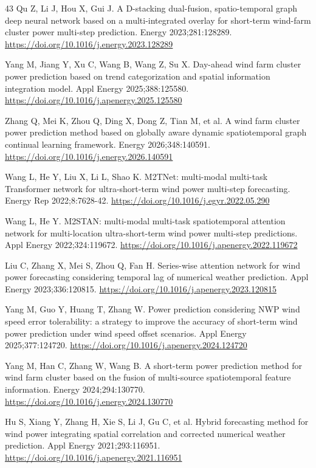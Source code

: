\begin{thebibliography}{43}
Qu Z, Li J, Hou X, Gui J. A D-stacking dual-fusion, spatio-temporal graph deep neural network based on a multi-integrated overlay for short-term wind-farm cluster power multi-step prediction. Energy 2023;281:128289. \url{https://doi.org/10.1016/j.energy.2023.128289}

Yang M, Jiang Y, Xu C, Wang B, Wang Z, Su X. Day-ahead wind farm cluster power prediction based on trend categorization and spatial information integration model. Appl Energy 2025;388:125580. \url{https://doi.org/10.1016/j.apenergy.2025.125580}

Zhang Q, Mei K, Zhou Q, Ding X, Dong Z, Tian M, et al. A wind farm cluster power prediction method based on globally aware dynamic spatiotemporal graph continual learning framework. Energy 2026;348:140591. \url{https://doi.org/10.1016/j.energy.2026.140591}

Wang L, He Y, Liu X, Li L, Shao K. M2TNet: multi-modal multi-task Transformer network for ultra-short-term wind power multi-step forecasting. Energy Rep 2022;8:7628-42. \url{https://doi.org/10.1016/j.egyr.2022.05.290}

Wang L, He Y. M2STAN: multi-modal multi-task spatiotemporal attention network for multi-location ultra-short-term wind power multi-step predictions. Appl Energy 2022;324:119672. \url{https://doi.org/10.1016/j.apenergy.2022.119672}

Liu C, Zhang X, Mei S, Zhou Q, Fan H. Series-wise attention network for wind power forecasting considering temporal lag of numerical weather prediction. Appl Energy 2023;336:120815. \url{https://doi.org/10.1016/j.apenergy.2023.120815}

Yang M, Guo Y, Huang T, Zhang W. Power prediction considering NWP wind speed error tolerability: a strategy to improve the accuracy of short-term wind power prediction under wind speed offset scenarios. Appl Energy 2025;377:124720. \url{https://doi.org/10.1016/j.apenergy.2024.124720}

Yang M, Han C, Zhang W, Wang B. A short-term power prediction method for wind farm cluster based on the fusion of multi-source spatiotemporal feature information. Energy 2024;294:130770. \url{https://doi.org/10.1016/j.energy.2024.130770}

Hu S, Xiang Y, Zhang H, Xie S, Li J, Gu C, et al. Hybrid forecasting method for wind power integrating spatial correlation and corrected numerical weather prediction. Appl Energy 2021;293:116951. \url{https://doi.org/10.1016/j.apenergy.2021.116951}


\end{thebibliography}
